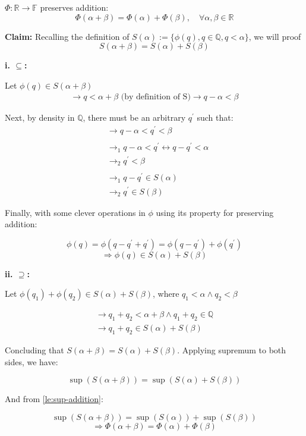 
\begin{lemma}\label{le:Phi-additive}
$\Phi: \mathbb{R} \rightarrow \mathbb{F}$ preserves addition:
$$\Phi(\alpha + \beta) = \Phi(\alpha) + \Phi(\beta), \quad \forall \alpha, \beta \in \mathbb{R}$$
\end{lemma}

\begin{bookproof}
\textbf{Claim:} Recalling the definition of $S(\alpha) := \{\phi(q), q \in \mathbb{Q}, q < \alpha\}$, we will proof $$S(\alpha + \beta) = S(\alpha) + S(\beta)$$

\textbf{i. $\subseteq$:}

Let $\phi(q) \in S(\alpha + \beta)$
\begin{align*}
\rightarrow q < \alpha + \beta \text{ (by definition of S)}
\rightarrow q - \alpha < \beta
\end{align*}

Next, by density in $\mathbb{Q}$, there must be an arbitrary $q^\prime$ such that:
\begin{align*}
&\rightarrow q - \alpha < q^\prime < \beta \\\\
&\rightarrow_{1} q - \alpha < q^\prime \leftrightarrow q - q^\prime < \alpha \\
&\rightarrow_{2} q^\prime < \beta \\\\
&\rightarrow_{1} q - q^\prime \in S(\alpha) \\
&\rightarrow_{2} q^\prime \in S(\beta)
\end{align*}

Finally, with some clever operations in $\phi$ using its property for preserving addition:

$$\phi(q) = \phi(q - q^\prime + q^\prime) = \phi(q - q^\prime) + \phi(q^\prime)$$
$$\Rightarrow \phi(q) \in S(\alpha) + S(\beta)$$

\textbf{ii. $\supseteq$:}

Let $\phi(q_1) + \phi(q_2) \in S(\alpha) + S(\beta)$, where $q_1 < \alpha \wedge q_2 < \beta$

\begin{align*}
\rightarrow q_1 + q_2 < \alpha + \beta \wedge q_1 + q_2 \in \mathbb{Q} \\
\rightarrow q_1 + q_2 \in S(\alpha) + S(\beta)
\end{align*}

Concluding that $S(\alpha + \beta) = S(\alpha) + S(\beta)$.
Applying supremum to both sides, we have:

$$\sup(S(\alpha + \beta)) = \sup(S(\alpha) + S(\beta))$$

And from \cref{le:sup-addition}:

$$\sup(S(\alpha + \beta)) = \sup(S(\alpha)) + \sup(S(\beta))$$
$$\Rightarrow \Phi(\alpha + \beta) = \Phi(\alpha) + \Phi(\beta)$$
\end{bookproof}

